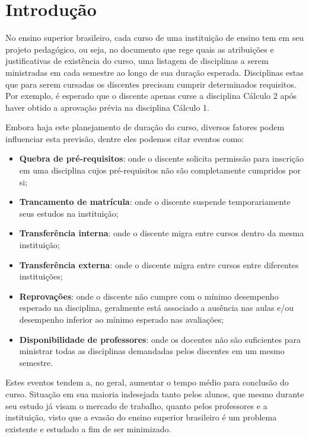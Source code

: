 \chapter{Introdução} \label{chap:introducao} %

No ensino superior brasileiro, cada curso de uma instituição de ensino tem em seu projeto pedagógico, ou seja, no documento que rege quais as atribuições e justificativas de existência do curso, uma listagem de disciplinas a serem ministradas em cada semestre ao longo de sua duração esperada. Disciplinas estas que para serem cursadas os discentes precisam cumprir determinados requisitos. Por exemplo, é esperado que o discente apenas curse a disciplina Cálculo 2 após haver obtido a aprovação prévia na disciplina Cálculo 1.

Embora haja este planejamento de duração do curso, diversos fatores podem influenciar esta previsão, dentre eles podemos citar eventos como:

\begin{itemize}
  \item \textbf{Quebra de pré-requisitos}: onde o discente solicita permissão para inscrição em uma disciplina cujos pré-requisitos não são completamente cumpridos por si;
  \item \textbf{Trancamento de matrícula}: onde o discente suspende temporariamente seus estudos na instituição;
  \item \textbf{Transferência interna}: onde o discente migra entre cursos dentro da mesma instituição;
  \item \textbf{Transferência externa}: onde o discente migra entre cursos entre diferentes instituições;
  \item \textbf{Reprovações}: onde o discente não cumpre com o mínimo desempenho esperado na disciplina, geralmente está associado a ausência nas aulas e/ou desempenho inferior ao mínimo esperado nas avaliações;
  \item \textbf{Disponibilidade de professores}: onde os docentes não são suficientes para ministrar todas as disciplinas demandadas pelos discentes em um mesmo semestre.
\end{itemize}

Estes eventos tendem a, no geral, aumentar o tempo médio para conclusão do curso. Situação em sua maioria indesejada tanto pelos alunos, que mesmo durante seu estudo já visam o mercado de trabalho, quanto pelos professores e a instituição, visto que a evasão do ensino superior brasileiro é um problema existente e estudado a fim de ser minimizado.

